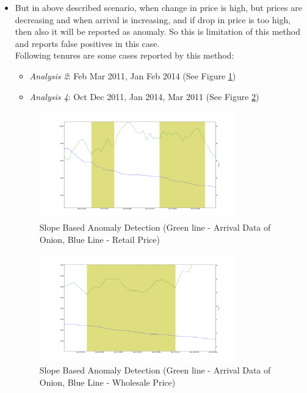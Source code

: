 \documentclass[a4paper,10pt]{report}
\begin{document}
\begin{itemize}
			\item But in above described scenario, when change in price is high, but prices are decreasing and when arrival is increasing, and if drop in price is too high, then also it will be reported as anomaly.	So this is limitation of this method and reports false positives in this case.\\
			Following tenures are some cases reported by this method:
			
			\begin{itemize}
				\item \textit{Analysis 2}: Feb Mar 2011, Jan Feb 2014 (See Figure \ref{fig:12122})
				\item \textit{Analysis 4}: Oct Dec 2011, Jan 2014, Mar 2011 (See Figure \ref{fig:12142})
			\end{itemize}
			
			\begin{figure}[H]
		    	\centering
  		    	\includegraphics[width=0.8\textwidth]{graphs/12122.png}
		    	\caption{Slope Based Anomaly Detection (Green line - Arrival Data of Onion, Blue Line - Retail Price)}
		    	\label{fig:12122}
			\end{figure}
			
			\begin{figure}[H]
		    	\centering
  		    	\includegraphics[width=0.8\textwidth]{graphs/12142.png}
		    	\caption{Slope Based Anomaly Detection (Green line - Arrival Data of Onion, Blue Line - Wholesale Price)}
		    	\label{fig:12142}
			\end{figure}
			

\end{itemize}
\end{document}
